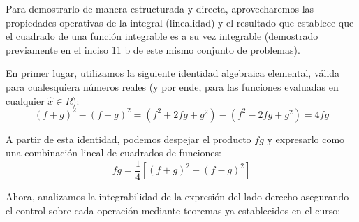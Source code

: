 \documentclass[11pt,letterpaper]{article}
\begin{document}
Para demostrarlo de manera estructurada y directa, aprovecharemos las propiedades operativas de la integral (linealidad) y el resultado que establece que el cuadrado de una función integrable es a su vez integrable (demostrado previamente en el inciso 11 b de este mismo conjunto de problemas).

En primer lugar, utilizamos la siguiente identidad algebraica elemental, válida para cualesquiera números reales (y por ende, para las funciones evaluadas en cualquier $\hat{x} \in R$):
\begin{equation*}
(f+g)^2 - (f-g)^2 = (f^2 + 2fg + g^2) - (f^2 - 2fg + g^2) = 4fg
\end{equation*}

A partir de esta identidad, podemos despejar el producto $fg$ y expresarlo como una combinación lineal de cuadrados de funciones:
\begin{equation*}
fg = \frac{1}{4} \left[ (f+g)^2 - (f-g)^2 \right]
\end{equation*}

Ahora, analizamos la integrabilidad de la expresión del lado derecho asegurando el control sobre cada operación mediante teoremas ya establecidos en el curso:
\end{document}
